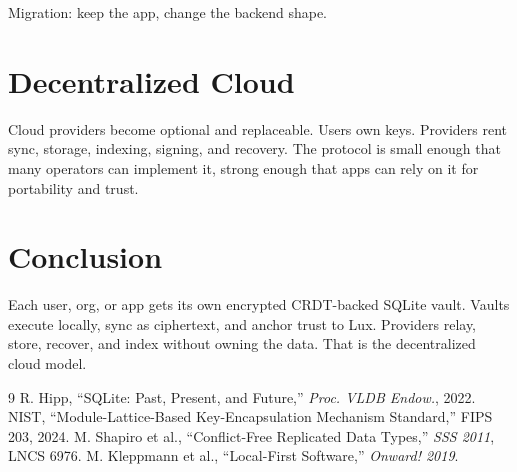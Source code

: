 \documentclass[twocolumn,11pt]{article}
\begin{document}
Migration: keep the app, change the backend shape.

\section{Decentralized Cloud}

Cloud providers become optional and replaceable. Users own keys. Providers rent sync, storage, indexing, signing, and recovery. The protocol is small enough that many operators can implement it, strong enough that apps can rely on it for portability and trust.

\section{Conclusion}

Each user, org, or app gets its own encrypted CRDT-backed SQLite vault. Vaults execute locally, sync as ciphertext, and anchor trust to Lux. Providers relay, store, recover, and index without owning the data. That is the decentralized cloud model.


\begin{thebibliography}{9}
 R. Hipp, ``SQLite: Past, Present, and Future,'' \textit{Proc. VLDB Endow.}, 2022.
 NIST, ``Module-Lattice-Based Key-Encapsulation Mechanism Standard,'' FIPS 203, 2024.
 M. Shapiro et al., ``Conflict-Free Replicated Data Types,'' \textit{SSS 2011}, LNCS 6976.
 M. Kleppmann et al., ``Local-First Software,'' \textit{Onward! 2019}.
\end{thebibliography}
\end{document}
